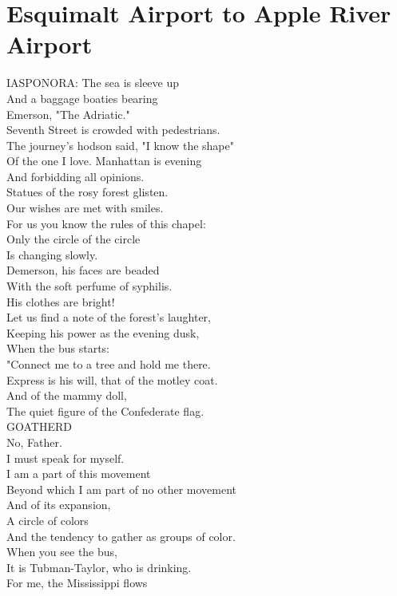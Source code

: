 \documentclass[smalldemyvopaper,11pt,twoside,onecolumn,openright,extrafontsizes]{memoir}
\begin{document}
\chapter{Esquimalt Airport to Apple River Airport}
IASPONORA: The sea is sleeve up
\\And a baggage boaties bearing
\\Emerson, "The Adriatic."
\\Seventh Street is crowded with pedestrians.
\\The journey's hodson said, "I know the shape"
\\Of the one I love. Manhattan is evening
\\And forbidding all opinions.
\\Statues of the rosy forest glisten.
\\Our wishes are met with smiles.
\\For us you know the rules of this chapel:
\\Only the circle of the circle
\\Is changing slowly.
\\Demerson, his faces are beaded
\\With the soft perfume of syphilis.
\\His clothes are bright!
\\Let us find a note of the forest's laughter,
\\Keeping his power as the evening dusk,
\\When the bus starts:
\\"Connect me to a tree and hold me there.
\\Express is his will, that of the motley coat.
\\And of the mammy doll,
\\The quiet figure of the Confederate flag.
\\GOATHERD
\\No, Father.
\\I must speak for myself.
\\I am a part of this movement
\\Beyond which I am part of no other movement
\\And of its expansion,
\\A circle of colors
\\And the tendency to gather as groups of color.
\\When you see the bus,
\\It is Tubman-Taylor, who is drinking.
\\For me, the Mississippi flows
\end{document}
